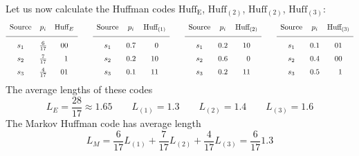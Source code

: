 \documentclass[11pt]{article}
\newcommand{\ph}{\phantom}
\begin{document}
\begin{itemize}
   Let us now calculate the Huffman codes
   $\text{Huff}_\text{E}$,
   $\text{Huff}_{(2)}$,
   $\text{Huff}_{(2)}$,
   $\text{Huff}_{(3)}$:
   \[\begin{array}{ccc}
       \text{Source} & p_i           & \text{Huff}_E\\[2mm]\hline\\[-2mm]
         s_1         & \frac{6}{17}  &        00    \\[2mm]
         s_2         & \frac{7}{17}  &   \ph{1}1    \\[2mm]
         s_3         & \frac{4}{17}  &        01
     \end{array}\qquad
     \begin{array}{ccc}
       \text{Source} & p_i           & \text{Huff}_{(1)}\\[2mm]\hline\\[-2mm]
         s_1         & 0.7           &   \ph{1}0    \\[2mm]
         s_2         & 0.2           &        10    \\[2mm]
         s_3         & 0.1           &        11
     \end{array}\qquad
     \begin{array}{ccc}
       \text{Source} & p_i           & \text{Huff}_{(2)}\\[2mm]\hline\\[-2mm]
         s_1         & 0.2           &        10    \\[2mm]
         s_2         & 0.6           &   \ph{1}0    \\[2mm]
         s_3         & 0.2           &        11
     \end{array}\qquad
     \begin{array}{ccc}
       \text{Source} & p_i           & \text{Huff}_{(3)}\\[2mm]\hline\\[-2mm]
         s_1         & 0.1           &        01    \\[2mm]
         s_2         & 0.4           &        00    \\[2mm]
         s_3         & 0.5           &   \ph{1}1
     \end{array}\]
   The average lengths of these codes
   \[
     L_E        = \frac{28}{17}\approx 1.65\qquad
     L_{(1)}    = 1.3\qquad
     L_{(2)}    = 1.4\qquad
     L_{(3)}    = 1.6
   \]
   The Markov Huffman code has average length
   \[
     L_M = \frac{6}{17}L_{(1)}
         + \frac{7}{17}L_{(2)}
         + \frac{4}{17}L_{(3)}
         = \frac{6}{17}1.3
\]
\end{itemize}
\end{document}
